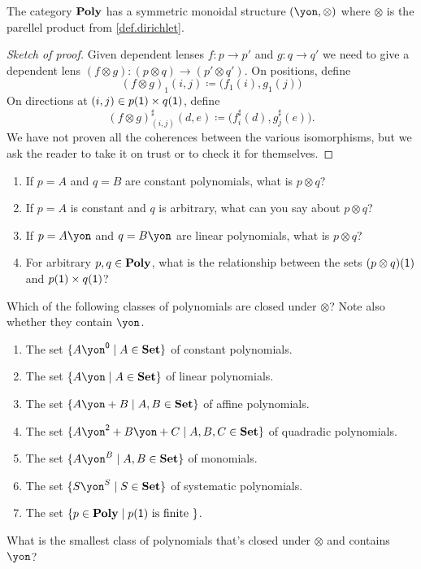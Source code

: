 \documentclass[DynamicalBook]{subfiles}
\begin{document}
\begin{proposition}\label{prop.dirichlet_monoidal}
The category $\textbf{Poly}$ has a symmetric monoidal structure $(\yon,\otimes)$ where $\otimes$ is the parellel product from \cref{def.dirichlet}.
\end{proposition}
\begin{proof}[Sketch of proof]
Given dependent lenses $f\colon p\to p'$ and $g\colon q\to q'$ we need to give a
dependent lens $(f\otimes g)\colon (p\otimes q)\to (p'\otimes q')$. On positions, define
\[
(f\otimes g)_1(i,j)\coloneqq \big(f_1(i),g_1(j)\big)
\]
On directions at $(i,j)\in p(\textsf{1})\times q(\textsf{1})$, define
\[
  (f\otimes g)^\sharp_{(i,j)}(d,e)\coloneqq
  \big(f^\sharp_i(d),g^\sharp_j(e)\big).
\]
We have not proven all the coherences between the various isomorphisms, but we ask the reader to take it on trust or to check it for themselves. 
\end{proof}

\begin{exercise}
\begin{enumerate}
	\item If $p=A$ and $q=B$ are constant polynomials, what is $p\otimes q$?
	\item If $p=A$ is constant and $q$ is arbitrary, what can you say about $p\otimes q$?
	\item If $p=A\yon$ and $q=B\yon$ are linear polynomials, what is $p\otimes q$?
	\item For arbitrary $p,q\in\textbf{Poly}$, what is the relationship between the sets $(p\otimes q)(\textsf{1})$ and $p(\textsf{1})\times q(\textsf{1})$?
\qedhere
\end{enumerate}
\end{exercise}

\begin{exercise}\label{exc.dir_closed_classes}
Which of the following classes of polynomials are closed under $\otimes$? Note also whether they contain $\yon$.
\begin{enumerate}
	\item The set $\{A\yon^\0\mid A\in\smset\}$ of constant polynomials.
	\item The set $\{A\yon\mid A\in\smset\}$ of linear polynomials.
	\item The set $\{A\yon+B\mid A,B\in\smset\}$ of affine polynomials.
	\item The set $\{A\yon^\2+B\yon+C\mid A,B,C\in\smset\}$ of quadradic polynomials.
	\item The set $\{A\yon^B\mid A,B\in\smset\}$ of monomials.
	\item The set $\{S\yon^S\mid S\in\smset\}$ of systematic polynomials.
	\item The set $\{p\in\textbf{Poly}\mid p(\textsf{1})\text{ is finite }\}$.
\end{enumerate}
What is the smallest class of polynomials that's closed under $\otimes$ and contains $\yon$?
\end{exercise}
\end{document}
